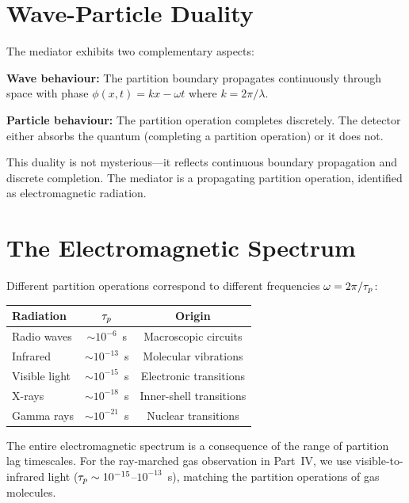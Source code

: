 \section{Wave-Particle Duality}
\label{sec:duality}

The mediator exhibits two complementary aspects:

\textbf{Wave behaviour:} The partition boundary propagates continuously through space with phase $\phi(x,t) = kx - \omega t$ where $k = 2\pi/\lambda$.

\textbf{Particle behaviour:} The partition operation completes discretely. The detector either absorbs the quantum (completing a partition operation) or it does not.

This duality is not mysterious---it reflects continuous boundary propagation and discrete completion. The mediator is a propagating partition operation, identified as electromagnetic radiation.

\section{The Electromagnetic Spectrum}
\label{sec:spectrum}

Different partition operations correspond to different frequencies $\omega = 2\pi/\tau_p$:
\begin{center}
\begin{tabular}{lcc}
\toprule
\textbf{Radiation} & $\tau_p$ & \textbf{Origin} \\
\midrule
Radio waves    & $\sim 10^{-6}$~s  & Macroscopic circuits \\
Infrared       & $\sim 10^{-13}$~s & Molecular vibrations \\
Visible light  & $\sim 10^{-15}$~s & Electronic transitions \\
X-rays         & $\sim 10^{-18}$~s & Inner-shell transitions \\
Gamma rays     & $\sim 10^{-21}$~s & Nuclear transitions \\
\bottomrule
\end{tabular}
\end{center}

The entire electromagnetic spectrum is a consequence of the range of partition lag timescales. For the ray-marched gas observation in Part~IV, we use visible-to-infrared light ($\tau_p \sim 10^{-15}$--$10^{-13}$~s), matching the partition operations of gas molecules.


